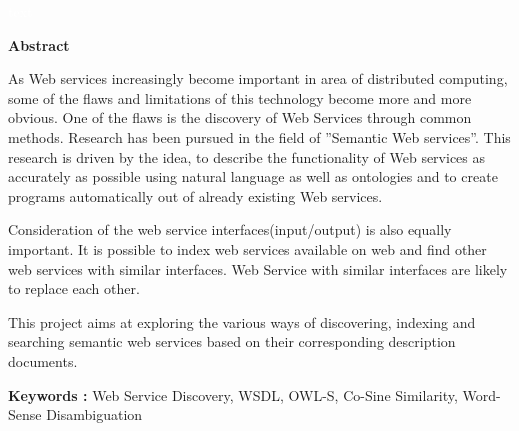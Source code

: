 \documentclass[12pt, oneside]{book}
\begin{document}
\pagebreak \textcolor{white}{text} \pagebreak
\thispagestyle{empty}
\begin{center}
	\textbf{ \huge Abstract}
\end{center}
\vspace{1cm}
As Web services increasingly become important in area of distributed computing, some of the flaws and limitations of this technology become more and more obvious. One of the flaws is the discovery of Web Services through common methods. Research has been pursued in the field of ”Semantic Web services”. This research is driven by the idea, to describe the functionality of Web services as accurately as possible using natural language as well as ontologies and to create programs automatically out of already existing Web services. \\ \par
Consideration of the web service interfaces(input/output) is also equally important. It is possible to index web services available on web and find other web services with similar interfaces. Web Service with similar interfaces are likely to replace each other. \\ \par
This project aims at exploring the various ways of discovering, indexing and searching semantic web services based on their corresponding description documents. \\ \par
\textbf{Keywords : }Web Service Discovery, WSDL, OWL-S, Co-Sine Similarity, Word-Sense Disambiguation
\pagebreak
\thispagestyle{empty}
\pagebreak
\listoffigures
\listoftables
\tableofcontents

\pagebreak

\setcounter{page}{1}
\end{document}
